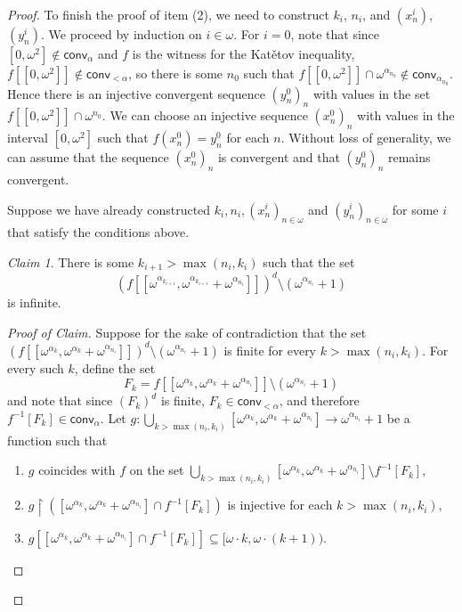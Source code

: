 \documentclass{amsart}
\theoremstyle{plain}
\theoremstyle{definition}
\theoremstyle{remark}
\newtheorem*{claim}{Claim}
\newcommand{\conv}{\mathsf{conv}}
\renewcommand{\subset}{\subseteq}
\begin{document}
\begin{proof}
To finish the proof of item (2), we need to construct $k_i$, $n_i$, and $(x^i_n)$, $(y^i_n)$. 
We proceed by induction  on $i\in\omega$. For $i=0$, note that  since $[0,\omega^2]\notin\conv_\alpha$ and $f$ is the witness for the Kat\v{e}tov inequality, $f[[0,\omega^2]]\notin\conv_{<\alpha}$, so there is some $n_0$ such that $f[[0,\omega^2]]\cap\omega^{\alpha_{n_0}}\notin\conv_{\alpha_{n_0}}$. Hence there is an injective convergent sequence $(y^0_n)_n$ with values in the set $ f[[0,\omega^2]]\cap\omega^{n_0}$.
We can choose an injective sequence $(x^0_n)_n $ with values in the interval $[0,\omega^2]$ such that $f(x^0_n)=y^0_n$ for each $n$.
Without loss of generality,  we can assume that the sequence  $(x^0_n)_n$ is convergent and that $(y^0_n)_n$ remains convergent. 

Suppose we have already constructed $k_i, n_i, (x^i_n)_{n\in\omega}$ and $(y^i_n)_{n\in\omega}$ for some $i$ that satisfy the conditions above.

\begin{claim}    
There is some $k_{i+1}>\max(n_i,k_i)$ such that the set $$(f[[\omega^{\alpha_{k_{i+1}}},\omega^{\alpha_{k_{i+1}}}+\omega^{\alpha_{n_i}}]])^d\setminus (\omega^{\alpha_{n_i}}+1)$$ is infinite.
\end{claim}

\begin{proof}[Proof of Claim]
Suppose for the sake of contradiction that the set $(f[[\omega^{\alpha_k},\omega^{\alpha_k}+\omega^{\alpha_{n_i}}]])^d\setminus (\omega^{\alpha_{n_i}}+1)$ is finite for every  $k>\max(n_i,k_i)$.
For every such $k$, define the set $$F_k=f[[\omega^{\alpha_k},\omega^{\alpha_k}+\omega^{\alpha_{n_i}}]]\setminus (\omega^{\alpha_{n_i}}+1)$$ and note that since $(F_k)^d$ is finite, $F_k\in\conv_{<\alpha}$, and therefore $f^{-1}[F_k]\in\conv_\alpha$.  Let $g: \bigcup_{k>\max(n_i,k_i)} [\omega^{\alpha_k},\omega^{\alpha_k}+\omega^{\alpha_{n_i}}]\to\omega^{\alpha_{n_i}}+1$ be a function such that 

\begin{enumerate}
    \item $g$ coincides with $f$ on the set
$\bigcup_{k>\max(n_i,k_i)} [\omega^{\alpha_k},
 \omega^{\alpha_k}+\omega^{\alpha_{n_i}}]\setminus f^{-1}[F_k]$,


 \item $g\restriction ([\omega^{\alpha_k},\omega^{\alpha_k}+\omega^{\alpha_{n_i}}]\cap f^{-1}[F_k])$ is injective for each $k>\max(n_i,k_i)$,
 \item $g[ [\omega^{\alpha_k},\omega^{\alpha_k}+\omega^{\alpha_{n_i}}]\cap f^{-1}[F_k]]\subset[\omega\cdot k, \omega\cdot (k+1)).$ 


\end{enumerate}
\end{proof}
\end{proof}
\end{document}

